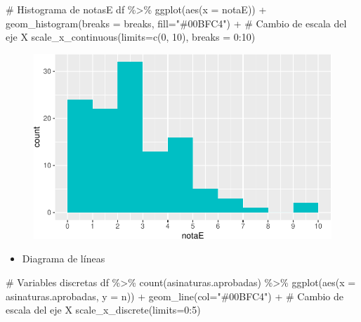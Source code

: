 \documentclass[
  a4paper,
]{scrreport}
\newenvironment{Shaded}{\begin{snugshade}}{\end{snugshade}}
\newcommand{\AttributeTok}[1]{\textcolor[rgb]{0.40,0.45,0.13}{#1}}
\newcommand{\CommentTok}[1]{\textcolor[rgb]{0.37,0.37,0.37}{#1}}
\newcommand{\DecValTok}[1]{\textcolor[rgb]{0.68,0.00,0.00}{#1}}
\newcommand{\FunctionTok}[1]{\textcolor[rgb]{0.28,0.35,0.67}{#1}}
\newcommand{\NormalTok}[1]{\textcolor[rgb]{0.00,0.23,0.31}{#1}}
\newcommand{\SpecialCharTok}[1]{\textcolor[rgb]{0.37,0.37,0.37}{#1}}
\newcommand{\StringTok}[1]{\textcolor[rgb]{0.13,0.47,0.30}{#1}}
\providecommand{\tightlist}{%
  \setlength{\itemsep}{0pt}\setlength{\parskip}{0pt}}\usepackage{longtable,booktabs,array}
\theoremstyle{definition}
\theoremstyle{definition}
\theoremstyle{remark}
\begin{document}
\begin{Shaded}
\begin{Highlighting}[]
\CommentTok{\# Histograma de notasE}
\NormalTok{df }\SpecialCharTok{\%\textgreater{}\%} \FunctionTok{ggplot}\NormalTok{(}\FunctionTok{aes}\NormalTok{(}\AttributeTok{x =}\NormalTok{ notaE)) }\SpecialCharTok{+} 
  \FunctionTok{geom\_histogram}\NormalTok{(}\AttributeTok{breaks =}\NormalTok{ breaks, }\AttributeTok{fill=}\StringTok{"\#00BFC4"}\NormalTok{) }\SpecialCharTok{+} 
  \CommentTok{\# Cambio de escala del eje X}
  \FunctionTok{scale\_x\_continuous}\NormalTok{(}\AttributeTok{limits=}\FunctionTok{c}\NormalTok{(}\DecValTok{0}\NormalTok{, }\DecValTok{10}\NormalTok{), }\AttributeTok{breaks =} \DecValTok{0}\SpecialCharTok{:}\DecValTok{10}\NormalTok{) }
\end{Highlighting}
\end{Shaded}

\begin{figure}[H]

{\centering \includegraphics{08-analisis-estadisticos_files/figure-pdf/unnamed-chunk-12-1.pdf}

}

\end{figure}

\begin{itemize}
\tightlist
\item
  Diagrama de líneas
\end{itemize}

\begin{Shaded}
\begin{Highlighting}[]
\CommentTok{\# Variables discretas}
\NormalTok{df }\SpecialCharTok{\%\textgreater{}\%} \FunctionTok{count}\NormalTok{(asinaturas.aprobadas) }\SpecialCharTok{\%\textgreater{}\%}
  \FunctionTok{ggplot}\NormalTok{(}\FunctionTok{aes}\NormalTok{(}\AttributeTok{x =}\NormalTok{ asinaturas.aprobadas, }\AttributeTok{y =}\NormalTok{ n)) }\SpecialCharTok{+}
  \FunctionTok{geom\_line}\NormalTok{(}\AttributeTok{col=}\StringTok{"\#00BFC4"}\NormalTok{) }\SpecialCharTok{+} 
  \CommentTok{\# Cambio de escala del eje X}
  \FunctionTok{scale\_x\_discrete}\NormalTok{(}\AttributeTok{limits=}\DecValTok{0}\SpecialCharTok{:}\DecValTok{5}\NormalTok{) }
\end{Highlighting}
\end{Shaded}
\end{document}
